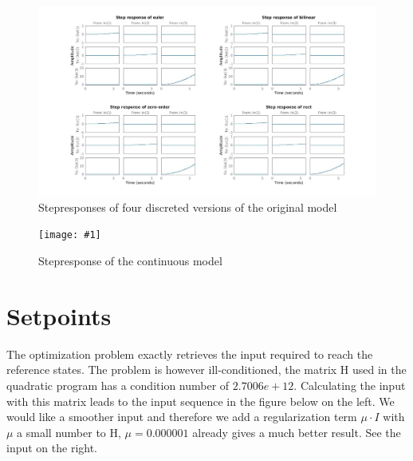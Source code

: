 \documentclass[•]{article}
\newcommand{\apicture}[2] {
  \begin{figure}[H]
  \centering
  \texttt{[image: \#1]}
  \caption{#2}
  \end{figure}
  }
\begin{document}
\begin{figure}[H]
\centering
\includegraphics[width=\textwidth]{stepresponse.jpg}
\caption{Stepresponses of four discreted versions of the original model}
\end{figure}

\apicture{steprespcont.jpg}{Stepresponse of the continuous model}

\section{Setpoints}
The optimization problem exactly retrieves the input required to reach the reference states. The problem is however ill-conditioned, the matrix H used in the quadratic program has a condition number of $2.7006e+12$. Calculating the input with this matrix leads to the input sequence in the figure below on the left. We would like a smoother input and therefore we add a regularization term  $\mu \cdot I$ with $\mu$ a small number to H,  $\mu = 0.000001$ already gives a much better result. See the input on the right. 
\end{document}
